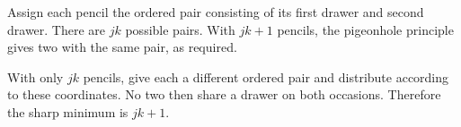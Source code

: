 Assign each pencil the ordered pair consisting of its first drawer and second drawer. There are $jk$ possible pairs. With $jk+1$ pencils, the pigeonhole principle gives two with the same pair, as required.

With only $jk$ pencils, give each a different ordered pair and distribute according to these coordinates. No two then share a drawer on both occasions. Therefore the sharp minimum is $\boxed{jk+1}$.
